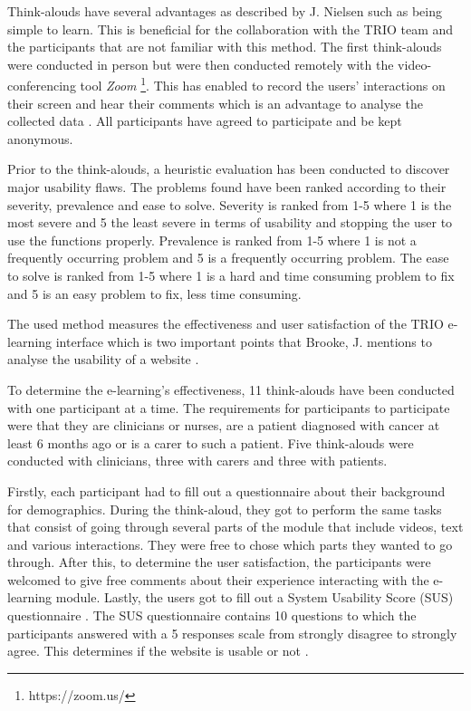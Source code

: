 \documentclass{sigchi}
\begin{document}
Think-alouds have several advantages as described by J. Nielsen \cite{nielsen2012thinking} such as being simple to learn. This is beneficial for the collaboration with the TRIO team and the participants that are not familiar with this method. The first think-alouds were conducted in person but were then conducted remotely with the video-conferencing tool \textit{Zoom} \footnote{https://zoom.us/}. This has enabled to record the users' interactions on their screen and hear their comments which is an advantage to analyse the collected data \cite{hammontree1994remote}. All participants have agreed to participate and be kept anonymous.

Prior to the think-alouds, a heuristic evaluation has been conducted to discover major usability flaws. The problems found have been ranked according to their severity, prevalence and ease to solve. Severity is ranked from 1-5 where 1 is the most severe and 5 the least severe in terms of usability and stopping the user to use the functions properly. Prevalence is ranked from 1-5 where 1 is not a frequently occurring problem and 5 is a frequently occurring problem. The ease to solve is ranked from 1-5 where 1 is a hard and time consuming problem to fix and 5 is an easy problem to fix, less time consuming. 

The used method measures the effectiveness and user satisfaction of the TRIO e-learning interface which is two important points that Brooke, J. mentions to analyse the usability of a website \cite{brooke1996sus}.

To determine the e-learning's effectiveness, 11 think-alouds have been conducted with one participant at a time. The requirements for participants to participate were that they are clinicians or nurses, are a patient diagnosed with cancer at least 6 months ago or is a carer to such a patient. Five think-alouds were conducted with clinicians, three with carers and three with patients.

Firstly, each participant had to fill out a questionnaire about their background for demographics. During the think-aloud, they got to perform the same tasks that consist of going through several parts of the module that include videos, text and various interactions. They were free to chose which parts they wanted to go through. After this, to determine the user satisfaction, the participants were welcomed to give free comments about their experience interacting with the e-learning module. Lastly, the users got to fill out a System Usability Score (SUS) questionnaire \cite{brooke1996sus}. The SUS questionnaire contains 10 questions to which the participants answered with a 5 responses scale from strongly disagree to strongly agree. This determines if the website is usable or not \cite{brooke1996sus}.
\end{document}
